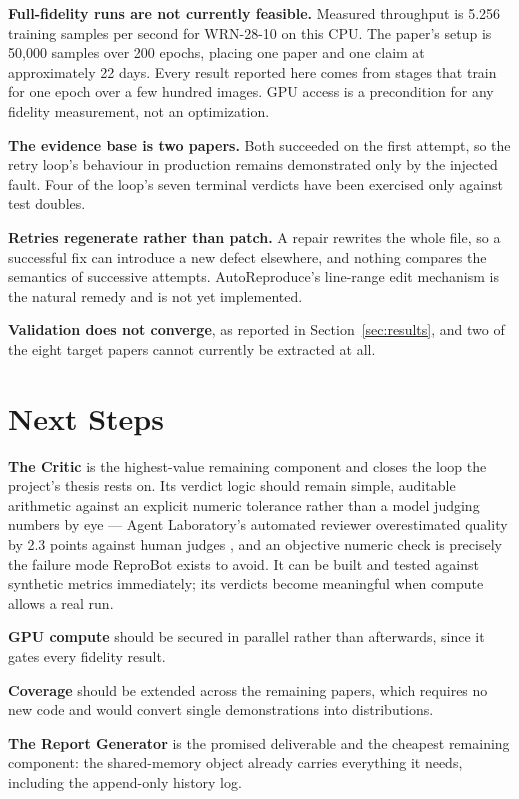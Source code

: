 \documentclass[11pt]{article}
\begin{document}
\textbf{Full-fidelity runs are not currently feasible.} Measured throughput is 5.256
training samples per second for WRN-28-10 on this CPU. The paper's setup is 50{,}000
samples over 200 epochs, placing one paper and one claim at approximately 22 days. Every
result reported here comes from stages that train for one epoch over a few hundred
images. GPU access is a precondition for any fidelity measurement, not an optimization.

\textbf{The evidence base is two papers.} Both succeeded on the first attempt, so the
retry loop's behaviour in production remains demonstrated only by the injected fault.
Four of the loop's seven terminal verdicts have been exercised only against test doubles.

\textbf{Retries regenerate rather than patch.} A repair rewrites the whole file, so a
successful fix can introduce a new defect elsewhere, and nothing compares the semantics of
successive attempts. AutoReproduce's line-range edit mechanism
\cite{zhao2025autoreproduce} is the natural remedy and is not yet implemented.

\textbf{Validation does not converge}, as reported in Section~\ref{sec:results}, and two
of the eight target papers cannot currently be extracted at all.

\section{Next Steps}
\label{sec:next}

\textbf{The Critic} is the highest-value remaining component and closes the loop the
project's thesis rests on. Its verdict logic should remain simple, auditable arithmetic
against an explicit numeric tolerance rather than a model judging numbers by eye ---
Agent Laboratory's automated reviewer overestimated quality by 2.3 points against human
judges \cite{schmidgall2025agentlab}, and an objective numeric check is precisely the
failure mode ReproBot exists to avoid. It can be built and tested against synthetic
metrics immediately; its verdicts become meaningful when compute allows a real run.

\textbf{GPU compute} should be secured in parallel rather than afterwards, since it gates
every fidelity result.

\textbf{Coverage} should be extended across the remaining papers, which requires no new
code and would convert single demonstrations into distributions.

\textbf{The Report Generator} is the promised deliverable and the cheapest remaining
component: the shared-memory object already carries everything it needs, including the
append-only history log.
\end{document}
